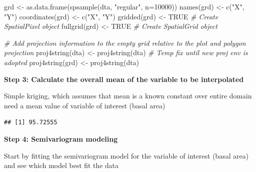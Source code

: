 \documentclass[
]{book}
\newenvironment{Shaded}{\begin{snugshade}}{\end{snugshade}}
\newcommand{\AttributeTok}[1]{\textcolor[rgb]{0.77,0.63,0.00}{#1}}
\newcommand{\CommentTok}[1]{\textcolor[rgb]{0.56,0.35,0.01}{\textit{#1}}}
\newcommand{\ConstantTok}[1]{\textcolor[rgb]{0.00,0.00,0.00}{#1}}
\newcommand{\DecValTok}[1]{\textcolor[rgb]{0.00,0.00,0.81}{#1}}
\newcommand{\FunctionTok}[1]{\textcolor[rgb]{0.00,0.00,0.00}{#1}}
\newcommand{\NormalTok}[1]{#1}
\newcommand{\OtherTok}[1]{\textcolor[rgb]{0.56,0.35,0.01}{#1}}
\newcommand{\SpecialCharTok}[1]{\textcolor[rgb]{0.00,0.00,0.00}{#1}}
\newcommand{\StringTok}[1]{\textcolor[rgb]{0.31,0.60,0.02}{#1}}
\begin{document}
\begin{Shaded}
\begin{Highlighting}[]
\NormalTok{grd              }\OtherTok{\textless{}{-}} \FunctionTok{as.data.frame}\NormalTok{(}\FunctionTok{spsample}\NormalTok{(dta, }\StringTok{"regular"}\NormalTok{, }\AttributeTok{n=}\DecValTok{10000}\NormalTok{))}
\FunctionTok{names}\NormalTok{(grd)       }\OtherTok{\textless{}{-}} \FunctionTok{c}\NormalTok{(}\StringTok{"X"}\NormalTok{, }\StringTok{"Y"}\NormalTok{)}
\FunctionTok{coordinates}\NormalTok{(grd) }\OtherTok{\textless{}{-}} \FunctionTok{c}\NormalTok{(}\StringTok{"X"}\NormalTok{, }\StringTok{"Y"}\NormalTok{)}
\FunctionTok{gridded}\NormalTok{(grd)     }\OtherTok{\textless{}{-}} \ConstantTok{TRUE}  \CommentTok{\# Create SpatialPixel object}
\FunctionTok{fullgrid}\NormalTok{(grd)    }\OtherTok{\textless{}{-}} \ConstantTok{TRUE}  \CommentTok{\# Create SpatialGrid object}

\CommentTok{\# Add projection information to the empty grid relative to the plot and polygon projection }
\FunctionTok{proj4string}\NormalTok{(dta) }\OtherTok{\textless{}{-}} \FunctionTok{proj4string}\NormalTok{(dta) }\CommentTok{\# Temp fix until new proj env is adopted}
\FunctionTok{proj4string}\NormalTok{(grd) }\OtherTok{\textless{}{-}} \FunctionTok{proj4string}\NormalTok{(dta)}
\end{Highlighting}
\end{Shaded}

\textbf{Step 3: Calculate the overall mean of the variable to be interpolated }

Simple kriging, which assumes that mean is a known constant over entire domain need a mean value of variable of interest (basal area)

\begin{Shaded}
\end{Shaded}

\begin{verbatim}
## [1] 95.72555
\end{verbatim}

\textbf{Step 4: Semivariogram modeling}

Start by fitting the semivariogram model for the variable of interest (basal area) and see which model best fit the data
\end{document}
